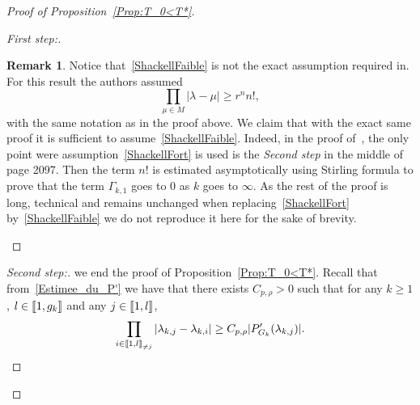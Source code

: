 \documentclass[11pt]{article}
\theoremstyle{definition}
\newtheorem{rema}[theo]{Remark}
\newenvironment{proofc}{\begin{proof}}{\end{proof}}
\numberwithin{equation}{section}
\numberwithin{figure}{section}
\numberwithin{table}{section}
\newenvironment{step}[1]{\begin{proof}[#1]}{\let\qed\relax\end{proof}}
\newcommand{\llbracket}{\mathopen{[\mkern -2.7mu[}}
\newcommand{\rrbracket}{\mathclose{]\mkern -2.7mu]}}
\newcommand{\inter}[2]{\llbracket #1,#2 \rrbracket}
\newcommand{\interexclu}[3]{\llbracket #1,#2\rrbracket_{\neq #3}}
\newcommand{\n}{g}
\begin{document}
\begin{proofc}[{Proof of Proposition~\ref{Prop:T_0<T*}}]
\begin{step}{First step:}
\begin{rema}
Notice that~\eqref{ShackellFaible} is not the exact assumption required in\linebreak\cite[Theorem~3.8]{AmmarKhodjaBenabdallahGonzalez-BurgosdeTeresa:2014}. For this result the authors assumed
\begin{equation}\label{ShackellFort}
\prod_{\mu\in M} |\lambda- \mu| \geq r^n n!,
\end{equation}
with the same notation as in the proof above. We claim that with the exact same proof it is sufficient to assume~\eqref{ShackellFaible}. Indeed, in the proof of~\cite[Theorem~3.8]{AmmarKhodjaBenabdallahGonzalez-BurgosdeTeresa:2014}, the only point were assumption~\eqref{ShackellFort} is used is the \emph{Second step} in the middle of page 2097. Then the term $n!$ is estimated asymptotically using Stirling formula to prove that the term $\Gamma_{k,1}$ goes to $0$ as $k$ goes to $\infty$. As the rest of the proof is long, technical and remains unchanged when replacing~\eqref{ShackellFort} by~\eqref{ShackellFaible} we do not reproduce it here for the sake of brevity.
\end{rema}
\end{step}

\begin{step}{Second step:}
we end the proof of Proposition~\ref{Prop:T_0<T*}. Recall that from~\eqref{Estimee_du_P'} we have that there exists $C_{p, \rho}>0$ such that for any $k\geq 1$, $l \in \inter{1}{\n_k}$ and any $j \in \inter{1}{l}$,
\begin{equation*}
\prod_{i\in \interexclu{1}{l}{j}} | \lambda_{k,j} - \lambda_{k,i}| \geq C_{p,\rho} |P_{G_k}' (\lambda_{k,j}) |.
\end{equation*}



\end{step}
\end{proofc}
\end{document}
